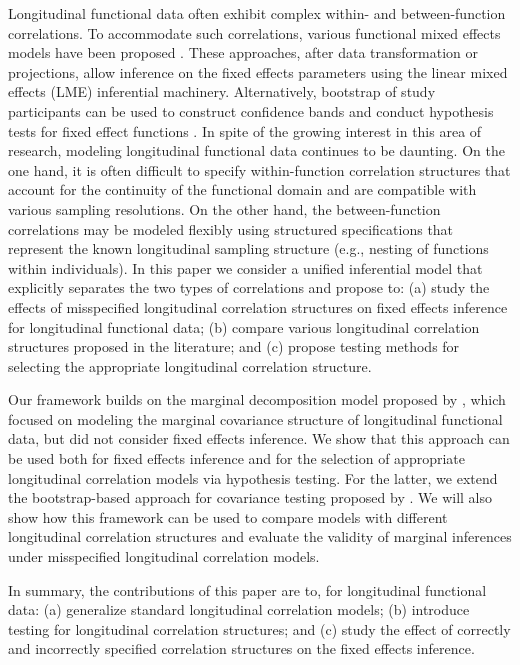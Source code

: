 \documentclass[submit]{smj}
\begin{document}
Longitudinal functional data often exhibit complex within- and between-function correlations. To accommodate such correlations, various functional mixed effects models have been proposed \citep{Di2009, Greven2010, Chen2012, Scheipl2015, Park2015,  Zhang2016, Chen2017,  Zhu2019, Lee2019}. These approaches, after data transformation or projections, allow inference on the fixed effects parameters using the linear mixed effects (LME) inferential machinery. Alternatively, bootstrap of study participants can be used to construct confidence bands and conduct hypothesis tests for fixed effect functions \citep{pmid22855258, Park2018, Zhu2019}. In spite of the growing interest in this area of research, modeling longitudinal functional data continues to be daunting. On the one hand, it is often difficult to specify within-function correlation structures that account for the continuity of the functional domain and are compatible with various sampling resolutions. On the other hand, the between-function correlations may be modeled flexibly using structured specifications that represent the known longitudinal sampling structure (e.g., nesting of functions within individuals). In this paper we consider a unified inferential model that explicitly separates the two types of correlations and propose to: (a) study the effects of misspecified longitudinal correlation structures on fixed effects inference for longitudinal functional data; (b) compare various longitudinal correlation structures proposed in the literature; and (c) propose testing methods for selecting the appropriate longitudinal correlation structure.

Our framework builds on the marginal decomposition model proposed by \cite{Park2015}, which focused on modeling the marginal covariance structure of longitudinal functional data, but did not consider fixed effects inference. We show that this approach can be used both for fixed effects inference and for the selection of appropriate longitudinal correlation models via hypothesis testing. For the latter, we extend the bootstrap-based approach for covariance testing proposed by \cite{Chen2019}. We will also show how this  framework can be used to compare models with different longitudinal correlation structures and evaluate the validity of marginal inferences under misspecified longitudinal correlation models.

In summary, the contributions of this paper are to, for longitudinal functional data: (a) generalize standard longitudinal correlation models; (b)  introduce testing for longitudinal correlation structures; and (c) study the effect of correctly and incorrectly specified correlation structures on the fixed effects inference.
\end{document}
